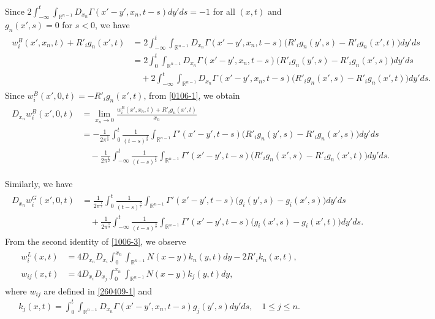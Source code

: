 \documentclass{amsart}
\numberwithin{equation}{section}
\newcommand{\Rn}{{\mathbb R}^{n-1}}
\newcommand{\Ga}{\Gamma}
\begin{document}
Since $2\int_{-\infty}^t \int_{\Rn} D_{x_n} \Ga(x' -y', x_n, t-s) dy' ds = -1$ for all $(x,t)$ and $g_n(x',s) = 0$ for $s < 0$, we have 
\begin{align}\label{0106-1}
\begin{split}
w_i^B(x', x_n,t) +  R'_i g_n(x', t) &= 2\int_{-\infty}^t \int_{\Rn} D_{x_n} \Ga(x' -y', x_n, t-s)\big( R'_i g_n(y',s) - R'_i g_n(x',t) \big) dy' ds \\
&= 2\int_0^t \int_{\Rn} D_{x_n} \Ga(x' -y', x_n, t-s) \big( R'_i g_n(y',s) - R'_i g_n(x',s) \big) dy' ds \\
& \quad +  2 \int_{-\infty}^t \int_{\Rn} D_{x_n} \Ga(x' -y', x_n, t-s) \big( R'_i g_n(x',s) - R'_i g_n(x',t) \big) dy' ds.
\end{split}
\end{align}
Since $w_i^B(x', 0, t) = -  R'_i g_n(x', t)$, from \eqref{0106-1}, we obtain 
\begin{align*}
\begin{split}
D_{x_n} w^B_i(x', 0,t) &= \lim_{x_n \rightarrow 0} \frac{w_i^B(x', x_n, t) +  R'_i g_n(x', t)}{x_n} \\
&= - \frac{1}{ 2\pi^ \frac12} \int_0^t \frac1{(t -s)^\frac32} \int_{\Rn} \Ga'(x' -y', t-s) \big( R'_i g_n(y',s) - R'_i g_n(x',s) \big) dy' ds \\
&\quad - \frac{1}{ 2\pi^ \frac12}  \int_{-\infty}^t \frac1{(t -s)^\frac32} \int_{\Rn} \Ga'(x' -y', t-s) \big( R'_i g_n(x',s) - R'_i g_n(x',t) \big) dy' ds. 
\end{split}
\end{align*}

Similarly, we have 
\begin{align*}
\begin{split}
 D_{x_n} w^G_i(x', 0,t) &=\frac{1}{ 2\pi^ \frac12} \int_0^t \frac1{(t -s)^\frac32} \int_{\Rn} \Ga'(x' -y', t-s) \big( g_i(y',s) - g_i(x',s) \big) dy' ds \\
&\quad + \frac{1}{ 2\pi^ \frac12}  \int_{-\infty}^t \frac1{(t -s)^\frac32} \int_{\Rn} \Ga'(x' -y', t-s) \big( g_i(x',s) - g_i(x',t) \big) dy' ds. 
\end{split}
\end{align*}
 From the second identity of \eqref{1006-3}, we observe
\begin{align}\label{0819-1-2}
\begin{split}
w^{L}_{i}(x,t) &= 4 D_{x_n} D_{x_i}\int_0^{x_n} \int_{\Rn} N(x-y) k_n(y,t)dy - 2R'_i k_n(x,t), \\
w_{ij}(x,t) &= 4 D_{x_i} D_{x_j} \int_0^{x_n} \int_{\Rn} N(x-y) k_j(y,t)dy,
\end{split}
\end{align}
where   $w_{ij}$ are defined in \eqref{260409-1} and 
 \begin{align*}%
k_j(x,t) = \int_0^t \int_{\Rn} D_{x_n} \Ga(x' -y', x_n, t-s) g_j(y',s) dy' ds, \quad 1 \leq j \leq n.
\end{align*}
\end{document}
